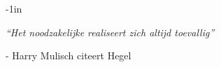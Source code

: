 \documentclass[a4paper,twoside,10pt]{article}
\begin{document}
\thispagestyle{empty}
\begin{adjustwidth}[]{}{-1in}%
  \begin{center}
    \titleGP
  \end{center}
\end{adjustwidth}
\newpage

\thispagestyle{empty}
\newpage
\mbox{}
\newpage

\thispagestyle{empty}
\newpage
\vspace*{\fill}
\begin{center}
{\center \it ``Het noodzakelijke realiseert zich altijd toevallig''}
\end{center}
\begin{flushright}
 - Harry Mulisch citeert Hegel
\end{flushright}
\vspace*{\fill}
\newpage 

\thispagestyle{empty}
\newpage
\mbox{}
\newpage

\thispagestyle{empty}

\newpage

\thispagestyle{empty}

\newpage

\tableofcontents








\clearpage
\newpage



\clearpage
\newpage
\appendix
{}



\end{document}
